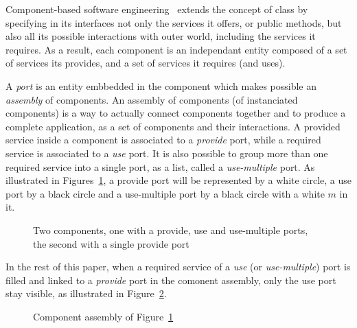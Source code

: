 Component-based software engineering~\cite{Szyperski:2002:CSB:515228} extends the concept of class by specifying in its interfaces not only the services it offers, or public methods, but also all its possible interactions with outer world, including the services it requires. As a result, each component is an independant entity composed of a set of services its provides, and a set of services it requires (and uses). 

A \emph{port} is an entity embbedded in the component which makes possible an \emph{assembly} of components. An assembly of components (of instanciated components) is a way to actually connect components together and to produce a complete application, as a set of components and their interactions. A provided service inside a component is associated to a \emph{provide} port, while a required service is associated to a \emph{use} port. It is also possible to group more than one required service into a single port, as a list, called a \emph{use-multiple} port. As illustrated in Figures~\ref{fig:ports}, a provide port will be represented by a white circle, a use port by a black circle and a use-multiple port by a black circle with a white $m$ in it.

\begin{figure}[h!]
\begin{center}
\caption{Two components, one with a provide, use and use-multiple ports, the second with a single provide port}
\label{fig:ports}
\end{center}
\end{figure}

In the rest of this paper, when a required service of a \emph{use} (or \emph{use-multiple}) port is filled and linked to a \emph{provide} port in the comonent assembly, only the use port stay visible, as illustrated in Figure~\ref{fig:assembly}.

\begin{figure}[h!]
\begin{center}
\caption{Component assembly of Figure~\ref{fig:ports}}
\label{fig:assembly}
\end{center}
\end{figure}

